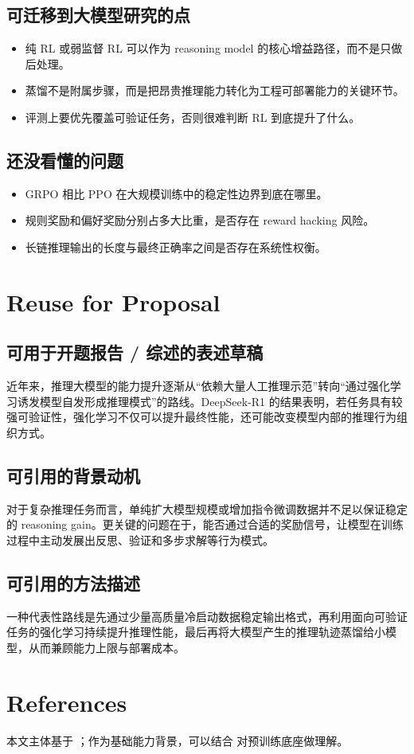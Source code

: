 \documentclass[UTF8,fontset=fandol,zihao=-4]{ctexart}
\begin{document}
\subsection{可迁移到大模型研究的点}
\begin{itemize}
  \item 纯 RL 或弱监督 RL 可以作为 reasoning model 的核心增益路径，而不是只做后处理。
  \item 蒸馏不是附属步骤，而是把昂贵推理能力转化为工程可部署能力的关键环节。
  \item 评测上要优先覆盖可验证任务，否则很难判断 RL 到底提升了什么。
\end{itemize}

\subsection{还没看懂的问题}
\begin{itemize}
  \item GRPO 相比 PPO 在大规模训练中的稳定性边界到底在哪里。
  \item 规则奖励和偏好奖励分别占多大比重，是否存在 reward hacking 风险。
  \item 长链推理输出的长度与最终正确率之间是否存在系统性权衡。
\end{itemize}

\section{Reuse for Proposal}

\subsection{可用于开题报告 / 综述的表述草稿}
近年来，推理大模型的能力提升逐渐从“依赖大量人工推理示范”转向“通过强化学习诱发模型自发形成推理模式”的路线。DeepSeek-R1 的结果表明，若任务具有较强可验证性，强化学习不仅可以提升最终性能，还可能改变模型内部的推理行为组织方式。

\subsection{可引用的背景动机}
对于复杂推理任务而言，单纯扩大模型规模或增加指令微调数据并不足以保证稳定的 reasoning gain。更关键的问题在于，能否通过合适的奖励信号，让模型在训练过程中主动发展出反思、验证和多步求解等行为模式。

\subsection{可引用的方法描述}
一种代表性路线是先通过少量高质量冷启动数据稳定输出格式，再利用面向可验证任务的强化学习持续提升推理性能，最后再将大模型产生的推理轨迹蒸馏给小模型，从而兼顾能力上限与部署成本。

\section{References}

本文主体基于 \cite{deepseekai2025r1}；作为基础能力背景，可以结合 \cite{deepseekai2024v3} 对预训练底座做理解。

\printbibliography[heading=none]
\end{document}
